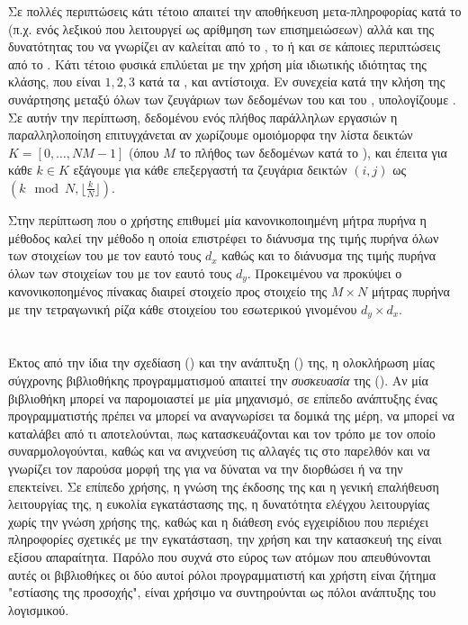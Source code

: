 Σε πολλές περιπτώσεις κάτι τέτοιο απαιτεί την αποθήκευση μετα-πληροφορίας κατά το \texttt{} (π.χ. ενός λεξικού που λειτουργεί ως αρίθμηση των επισημειώσεων) αλλά και της δυνατότητας του \texttt{} να γνωρίζει αν καλείται από το \texttt{}, το \texttt{} ή και σε κάποιες περιπτώσεις από το \texttt{}.
Κάτι τέτοιο φυσικά επιλύεται με την χρήση μία ιδιωτικής \texttt{} ιδιότητας της κλάσης, που είναι $1, 2, 3$ κατά τα \texttt{}, \texttt{} και \texttt{} αντίστοιχα.
Εν συνεχεία κατά την κλήση της συνάρτησης \texttt{} μεταξύ όλων των ζευγάριων των δεδομένων του \texttt{} και του \texttt{}, υπολογίζουμε \texttt{}.
Σε αυτήν την περίπτωση, δεδομένου ενός πλήθος παράλληλων εργασιών \texttt{} η παραλληλοποίηση επιτυγχάνεται αν χωρίζουμε ομοιόμορφα την λίστα δεικτών $K = [0, \dots, Ν Μ - 1]$ (όπου $Μ$ το πλήθος των δεδομένων κατά το \texttt{}), και έπειτα για κάθε $k \in K$ εξάγουμε για κάθε επεξεργαστή τα ζευγάρια δεικτών $(i,j)$ ως $(k\mod N, \lfloor \frac{k}{N} \rfloor)$.

Στην περίπτωση που ο χρήστης επιθυμεί μία κανονικοποιημένη μήτρα πυρήνα η μέθοδος \texttt{} καλεί την μέθοδο \texttt{} η οποία επιστρέφει το διάνυσμα της τιμής πυρήνα όλων των στοιχείων του \texttt{} με τον εαυτό τους $d_{x}$ καθώς και το διάνυσμα της τιμής πυρήνα όλων των στοιχείων του \texttt{} με τον εαυτό τους $d_{y}$.
Προκειμένου να προκύψει ο κανονικοποημένος πίνακας διαιρεί στοιχείο προς στοιχείο της $Μ \times N$ μήτρας πυρήνα με την τετραγωνική ρίζα κάθε στοιχείου του εσωτερικού γινομένου $d_{y} \times d_{x}$.


\section{}
Έκτος από την ίδια την σχεδίαση () και την ανάπτυξη () της, η ολοκλήρωση μίας σύγχρονης βιβλιοθήκης προγραμματισμού απαιτεί την \textit{συσκευασία} της ().
Αν μία βιβλιοθήκη μπορεί να παρομοιαστεί με μία μηχανισμό, σε επίπεδο ανάπτυξης ένας προγραμματιστής πρέπει να μπορεί να αναγνωρίσει τα δομικά της μέρη, να μπορεί να καταλάβει από τι αποτελούνται, πως κατασκευάζονται και τον τρόπο με τον οποίο συναρμολογούνται, καθώς και να ανιχνεύση τις αλλαγές τις στο παρελθόν και να γνωρίζει τον παρούσα μορφή της για να δύναται να την διορθώσει ή να την επεκτείνει.
Σε επίπεδο χρήσης, η γνώση της έκδοσης της και η γενική επαλήθευση λειτουργίας της, η ευκολία εγκατάστασης της, η δυνατότητα ελέγχου λειτουργίας χωρίς την γνώση χρήσης της, καθώς και η διάθεση ενός εγχειρίδιου που περιέχει πληροφορίες σχετικές με την εγκατάσταση, την χρήση και την κατασκευή της είναι εξίσου απαραίτητα.
Παρόλο που συχνά στο εύρος των ατόμων που απευθύνονται αυτές οι βιβλιοθήκες οι δύο αυτοί ρόλοι προγραμματιστή και χρήστη είναι ζήτημα "εστίασης της προσοχής", είναι χρήσιμο να συντηρούνται ως πόλοι ανάπτυξης του λογισμικού.
